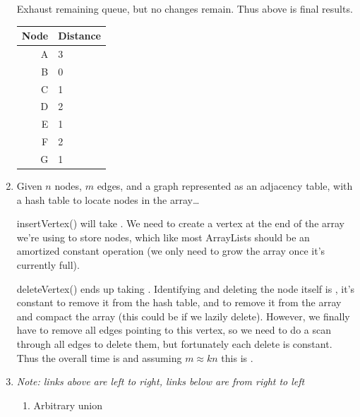 \documentclass[12pt]{chmullighw}
\begin{document}
\begin{enumerate}
Exhaust remaining queue, but no changes remain. Thus above is final results.

\begin{tabular}{ r | l }
Node & Distance \\
\hline
A & 3 \\
B & 0 \\
C & 1 \\
D & 2 \\
E & 1 \\
F & 2 \\
G & 1 \\
\end{tabular}

\item Given $n$ nodes, $m$ edges, and a graph represented as an adjacency table,
with a hash table to locate nodes in the array\ldots

insertVertex() will take . We need to create a vertex at the end of the
array we're using to store nodes, which like most ArrayLists should be an
amortized constant operation (we only need to grow the array once it's currently
full).

deleteVertex() ends up taking . Identifying and deleting the node itself
is , it's constant to remove it from the hash table, and  to
remove it from the array and compact the array (this could be  if we
lazily delete).  However, we finally have to remove all edges pointing to this
vertex, so we need to do a  scan through all edges to delete them, but
fortunately each delete is constant. Thus the overall time is  and
assuming $m \approx kn$ this is .

\item {\em Note: links above are left to right, links below are from right to left}

\begin{enumerate} \renewcommand{\labelenumii}{\alph{enumii}.}
    \item Arbitrary union

\end{enumerate}
\end{enumerate}
\end{document}
